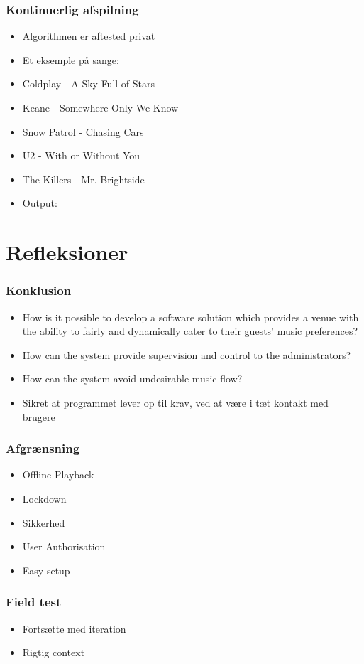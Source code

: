 \begin{frame}
	\frametitle{Kontinuerlig afspilning}
	\begin{itemize}
		\item Algorithmen er aftested privat
		\item Et eksemple på sange:
		\item Coldplay - A Sky Full of Stars
		\item Keane - Somewhere Only We Know 
		\item Snow Patrol - Chasing Cars
		\item U2 - With or Without You
		\item The Killers - Mr. Brightside 
		\item Output: 
	\end{itemize}
\end{frame}



\section{Refleksioner}

\begin{frame}
	\frametitle{Konklusion}
	\begin{itemize}
		\item How is it possible to develop a software solution which provides a venue with the ability to fairly and dynamically cater to their guests’ music preferences?
		\item How can the system provide supervision and control to the administrators?
		\item How can the system avoid undesirable music flow?
		\item Sikret at programmet lever op til krav, ved at være i tæt kontakt med brugere
	\end{itemize}
\end{frame}

\begin{frame}
	\frametitle{Afgrænsning}
	\begin{itemize}
		\item Offline Playback
		\item Lockdown
		\item Sikkerhed
		\item User Authorisation
		\item Easy setup
	\end{itemize}
\end{frame}

\begin{frame}
	\frametitle{Field test}
	\begin{itemize}
		\item Fortsætte med iteration
		\item Rigtig context
	\end{itemize}
\end{frame}
